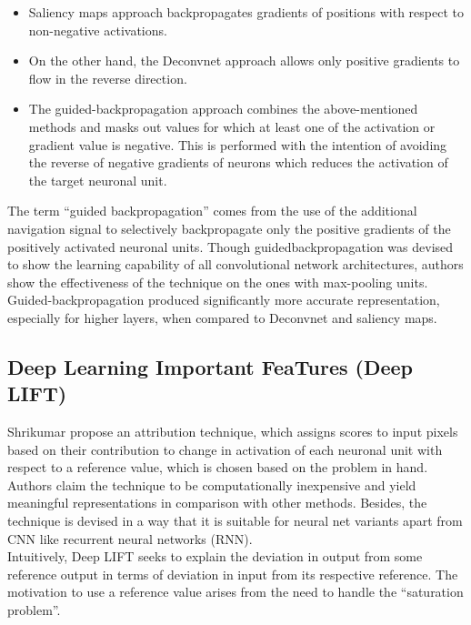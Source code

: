 \documentclass[../report.tex]{subfiles}
\begin{document}
 \begin{itemize}
 	\item Saliency maps approach backpropagates gradients of positions with respect to non-negative activations.
 	\item On the other hand, the Deconvnet approach allows only positive gradients to flow in the reverse direction.
 	\item The guided-backpropagation approach combines the above-mentioned methods and masks out values for which at least one of the activation or gradient value is negative. This is performed with the intention of avoiding the reverse of negative gradients of neurons which reduces the activation of the target neuronal unit.
 \end{itemize}

The term \enquote{guided backpropagation} comes from the use of the additional navigation signal to selectively backpropagate only the positive gradients of the positively activated neuronal units. Though guidedbackpropagation was devised to show the learning capability of all convolutional network architectures, authors show the effectiveness of the technique on the ones with max-pooling units. Guided-backpropagation produced significantly more accurate representation, especially for higher layers, when compared to Deconvnet and saliency maps.

\subsection{Deep Learning Important FeaTures (Deep LIFT)}
\noindent
 Shrikumar \etal \cite{shrikumar2017learning} propose an attribution technique, which assigns scores to input pixels based on their contribution to change in activation of each neuronal unit with respect to a reference value, which is chosen based on the problem in hand. Authors claim the technique to be computationally inexpensive and yield meaningful representations in comparison with other methods. Besides, the technique is devised in a way that it is suitable for neural net variants apart from CNN like recurrent neural networks (RNN).\\
 Intuitively, Deep LIFT seeks to explain the deviation in output from some reference output in terms of deviation in input from its respective reference. The motivation to use a reference value arises from the need to handle the \enquote{saturation problem}.
  
\end{document}
